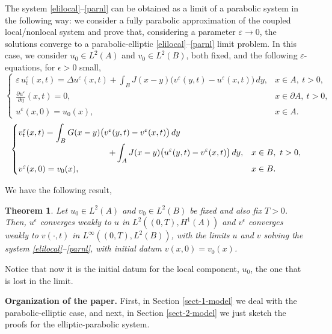 \documentclass[reqno]{amsart}
\numberwithin{equation}{section}
\newtheorem{theorem}{Theorem}[section]
\begin{document}
The system \eqref{elilocal}--\eqref{parnl} can be obtained as a limit of a parabolic system in the following way: we consider a fully parabolic approximation of the coupled local/nonlocal system and prove that, considering a parameter $\varepsilon \to 0$, the solutions converge to a parabolic-elliptic \eqref{elilocal}--\eqref{parnl} limit problem. In this case, we consider $u_0\in L^2(A)$ and $v_0\in L^2(B)$, both fixed, and the following $\varepsilon$-equations, for $\epsilon>0$ small,
\begin{equation}
\begin{cases}
\varepsilon\,  u^\varepsilon_t(x,t)
= \Delta u^\varepsilon(x,t)
+ \displaystyle\int_B J(x-y)\bigl(v^\varepsilon(y,t)-u^\varepsilon(x,t)\bigr)\,dy,
& x\in A,\ t>0,\\[1.2ex]
\displaystyle \frac{\partial u^\varepsilon}{\partial \eta}(x,t)=0,
& x\in \partial A,\ t>0,\\[1.2ex]
u^\varepsilon(x,0)=u_0(x),
& x\in A.
\end{cases}
\end{equation}
\begin{equation}
\begin{cases}
v^\varepsilon_t(x,t)
= \displaystyle\int_B G(x-y)\bigl(v^\varepsilon(y,t)-v^\varepsilon(x,t)\bigr)\,dy \\[0.6em]
\hspace{2.8em}
\displaystyle \qquad \qquad \qquad \qquad + \int_A J(x-y)\bigl(u^\varepsilon(y,t)-v^\varepsilon(x,t)\bigr)\,dy,
& x\in B,\ t>0, \\[1.2ex]
v^\varepsilon(x,0)=v_0(x),
& x\in B.
\end{cases}
\end{equation}


We have the following result,

\begin{theorem}\label{approximation}
Let $u_0\in L^2(A)$ and $v_0\in L^2(B)$ be fixed and also fix $T>0$. Then, $u^\epsilon$ converges weakly to $u$ in $L^2 ((0,T),H^1(A))$ and $v^\epsilon$ converges weakly to $v (\cdot, t)$ in $L^\infty((0,T),L^2(B))$, 
with the limits $u$ and $v$ solving the system \eqref{elilocal}--\eqref{parnl}, with initial datum $v(x,0)=v_0(x)$.
\end{theorem}

Notice that now it is the initial datum for the local component, $u_0$, the one that is lost in the limit.

\bigskip

{\bf Organization of the paper.} First, in Section \ref{sect-1-model} we deal with the parabolic-elliptic case, and next, in Section \ref{sect-2-model} we just
sketch the proofs for the elliptic-parabolic system. 
\end{document}
